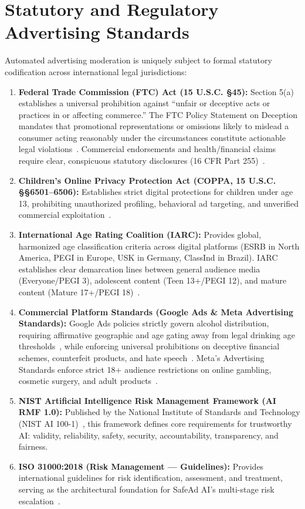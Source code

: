 \documentclass[12pt,a4paper]{report}
\begin{document}
\section{Statutory and Regulatory Advertising Standards}

Automated advertising moderation is uniquely subject to formal statutory codification across international legal jurisdictions:
\begin{enumerate}
    \item \textbf{Federal Trade Commission (FTC) Act (15 U.S.C. \S  45):} Section 5(a) establishes a universal prohibition against ``unfair or deceptive acts or practices in or affecting commerce.'' The FTC Policy Statement on Deception mandates that promotional representations or omissions likely to mislead a consumer acting reasonably under the circumstances constitute actionable legal violations~\cite{ftcdeception}. Commercial endorsements and health/financial claims require clear, conspicuous statutory disclosures (16 CFR Part 255)~\cite{ftc2023guides}.
    \item \textbf{Children's Online Privacy Protection Act (COPPA, 15 U.S.C. \S \S  6501--6506):} Establishes strict digital protections for children under age 13, prohibiting unauthorized profiling, behavioral ad targeting, and unverified commercial exploitation~\cite{ftc2023guides}.
    \item \textbf{International Age Rating Coalition (IARC):} Provides global, harmonized age classification criteria across digital platforms (ESRB in North America, PEGI in Europe, USK in Germany, ClassInd in Brazil). IARC establishes clear demarcation lines between general audience media (Everyone/PEGI 3), adolescent content (Teen 13+/PEGI 12), and mature content (Mature 17+/PEGI 18)~\cite{iarcratings}.
    \item \textbf{Commercial Platform Standards (Google Ads \& Meta Advertising Standards):} Google Ads policies strictly govern alcohol distribution, requiring affirmative geographic and age gating away from legal drinking age thresholds~\cite{googlealcohol}, while enforcing universal prohibitions on deceptive financial schemes, counterfeit products, and hate speech~\cite{googleadspolicy}. Meta's Advertising Standards enforce strict 18+ audience restrictions on online gambling, cosmetic surgery, and adult products~\cite{metaads}.
    \item \textbf{NIST Artificial Intelligence Risk Management Framework (AI RMF 1.0):} Published by the National Institute of Standards and Technology (NIST AI 100-1)~\cite{nistairmf2023}, this framework defines core requirements for trustworthy AI: validity, reliability, safety, security, accountability, transparency, and fairness.
    \item \textbf{ISO 31000:2018 (Risk Management --- Guidelines):} Provides international guidelines for risk identification, assessment, and treatment, serving as the architectural foundation for SafeAd AI's multi-stage risk escalation~\cite{iso31000}.
\end{enumerate}
\end{document}
